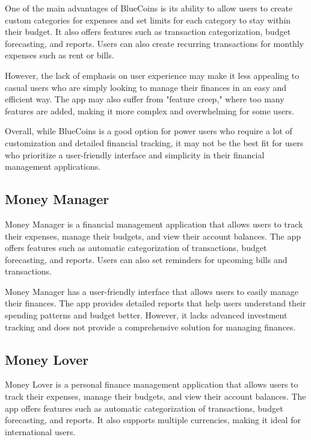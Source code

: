 \hspace{\parindent}One of the main advantages of BlueCoins is its ability to allow users to create custom categories for expenses and set limits for each category to stay within their budget. It also offers features such as transaction categorization, budget forecasting, and reports. Users can also create recurring transactions for monthly expenses such as rent or bills.

\hspace{\parindent}However, the lack of emphasis on user experience may make it less appealing to casual users who are simply looking to manage their finances in an easy and efficient way. The app may also suffer from "feature creep," where too many features are added, making it more complex and overwhelming for some users.

\hspace{\parindent}Overall, while BlueCoins is a good option for power users who require a lot of customization and detailed financial tracking, it may not be the best fit for users who prioritize a user-friendly interface and simplicity in their financial management applications.




\subsection{Money Manager}
Money Manager is a financial management application that allows users to track their expenses, manage their budgets, and view their account balances. The app offers features such as automatic categorization of transactions, budget forecasting, and reports. Users can also set reminders for upcoming bills and transactions.

Money Manager has a user-friendly interface that allows users to easily manage their finances. The app provides detailed reports that help users understand their spending patterns and budget better. However, it lacks advanced investment tracking and does not provide a comprehensive solution for managing finances.

\subsection{Money Lover}
Money Lover is a personal finance management application that allows users to track their expenses, manage their budgets, and view their account balances. The app offers features such as automatic categorization of transactions, budget forecasting, and reports. It also supports multiple currencies, making it ideal for international users.

